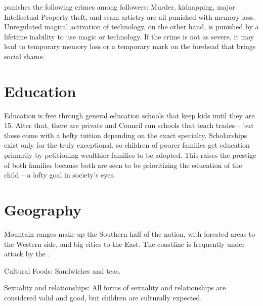 \documentclass[blue]{GL2020}
\begin{document}
\cTechGod{} punishes the following crimes among \cTechGod{\their} followers:  Murder, kidnapping, major Intellectual Property theft, and scam artistry are all punished with memory loss. Unregulated magical activation of technology, on the other hand, is punished by a lifetime inability to use magic or technology. If the crime is not as severe, it may lead to temporary memory loss or a temporary mark on the forehead that brings social shame.

	
\section{Education}
Education is free through general education schools that keep kids until they are 15. After that, there are private and Council run schools that teach trades -- but these come with a hefty tuition depending on the exact specialty. Scholarships exist only for the truly exceptional, so children of poorer families get education primarily by petitioning wealthier families to be adopted. This raises the prestige of both families because both are seen to be prioritizing the education of the child -- a lofty goal in society’s eyes.




\section*{Geography}
Mountain ranges make up the Southern half of the nation, with forested areas to the Western side, and big cities to the East. The coastline is frequently under attack by the \pShippies{}.


Cultural Foods:	Sandwiches and teas.


Sexuality and relationships:	All forms of sexuality and relationships are considered valid and good, but children are culturally expected.
\end{document}
